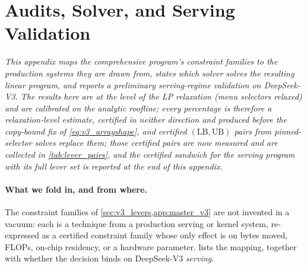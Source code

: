 \section{Audits, Solver, and Serving Validation}
\label{app:lp_provenance}

\emph{This appendix maps the comprehensive program's constraint families to the
production systems they are drawn from, states which solver solves the resulting
linear program, and reports a preliminary serving-regime validation on
DeepSeek-V3. The results here are at the level of the LP relaxation (menu
selectors relaxed) and are calibrated on the analytic roofline; every
percentage is therefore a relaxation-level estimate, certified in neither
direction and produced before the copy-bound fix of \eqref{eq:v3_arrayshape},
and certified $(\mathrm{LB},\mathrm{UB})$ pairs from pinned-selector solves
replace them; those certified pairs are now measured and are collected in
\cref{tab:lever_pairs}, and the certified sandwich for the serving program with
its full lever set is reported at the end of this appendix.}

\paragraph{What we fold in, and from where.}
The constraint families of \cref{sec:v3_levers,app:master_v3} are not invented in a
vacuum: each is a technique from a production serving or kernel system, re-expressed
as a certified constraint family whose only effect is on bytes moved, FLOPs,
on-chip residency, or a hardware parameter.  lists the mapping,
together with whether the decision binds on DeepSeek-V3 \emph{serving}.

